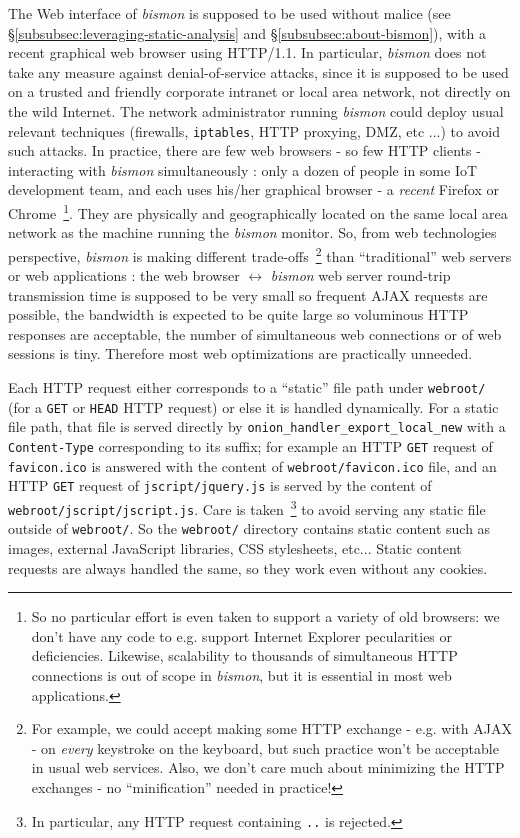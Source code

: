 The Web interface  of \emph{bismon} is supposed
to be used without malice (see
§\ref{subsubsec:leveraging-static-analysis} and
§\ref{subsubsec:about-bismon}), with a recent graphical web browser
using HTTP/1.1. In particular, \emph{bismon} does not take any measure
against  denial-of-service attacks, since it
is supposed to be used on a trusted and friendly corporate intranet or
local area network, not directly on the wild Internet. The network
administrator running \emph{bismon} could deploy usual relevant
techniques (firewalls, \texttt{iptables}, HTTP proxying, DMZ, etc ...)
to avoid such attacks. In practice, there are few web browsers - so
few HTTP clients - interacting with \emph{bismon} simultaneously :
only a dozen of people in some IoT development team, and each uses
his/her graphical browser - a \emph{recent} Firefox or
Chrome~\footnote{So no particular effort is even taken to support a
  variety of old browsers: we don't have any code to e.g. support
  Internet Explorer pecularities or deficiencies. Likewise,
  scalability to thousands of simultaneous HTTP connections is out of
  scope in \emph{bismon}, but it is essential in most web
  applications.}. They are physically and geographically located on
the same local area network as the machine running the \emph{bismon}
monitor. So, from web technologies perspective, \emph{bismon} is
making different trade-offs~\footnote{For example, we could accept
  making some HTTP exchange - e.g. with AJAX - on \emph{every}
  keystroke on the keyboard, but such practice won't be acceptable in
  usual web services. Also, we don't care much about minimizing the
  HTTP exchanges - no ``minification'' needed in practice!} than
``traditional'' web servers or web applications : the web browser
$\leftrightarrow$ \emph{bismon} web server round-trip transmission
time is supposed to be very small so frequent AJAX requests are
possible, the bandwidth is expected to be quite large so voluminous
HTTP responses are acceptable, the number of simultaneous web
connections or of web sessions is tiny. Therefore most web
optimizations are practically unneeded.

Each HTTP request   either
corresponds to a ``static'' file path under \texttt{webroot/} (for a
\texttt{GET} or \texttt{HEAD} HTTP request) or else it is handled
dynamically. For a static file path, that file is served directly by
\texttt{onion\_handler\_export\_local\_new} with a
\texttt{Content-Type} corresponding to its suffix; for example an HTTP
\texttt{GET} request of \texttt{favicon.ico} is answered with the
content of \texttt{webroot/favicon.ico} file, and an HTTP \texttt{GET}
request of \texttt{jscript/jquery.js} is served by the content of
\texttt{webroot/jscript/jscript.js}. Care is taken~\footnote{In
  particular, any HTTP request containing \texttt{..} is rejected.} to
avoid serving any static file outside of \texttt{webroot/}. So the
\texttt{webroot/} directory contains static content such as images,
external JavaScript libraries, CSS stylesheets, etc... Static content
requests are always handled the same, so they work even without any
cookies.  

